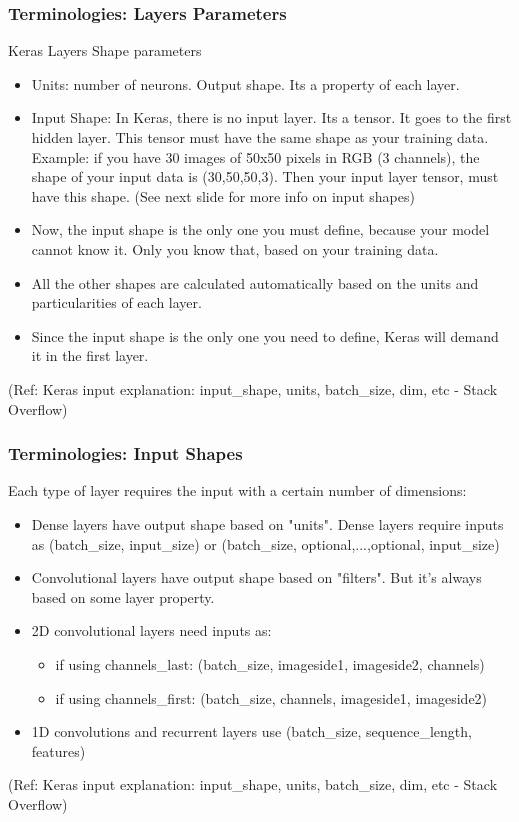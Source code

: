\begin{frame}[fragile] \frametitle{Terminologies: Layers Parameters}

Keras Layers Shape parameters

\begin{itemize}
\item Units: number of neurons. Output shape. Its a property of each layer.
\item Input Shape: In Keras, there is no input layer. Its a tensor. It goes to the first hidden layer. This tensor must have the same shape as your training data. Example: if you have 30 images of 50x50 pixels in RGB (3 channels), the shape of your input data is (30,50,50,3). Then your input layer tensor, must have this shape. (See next slide for more info on input shapes)
\item Now, the input shape is the only one you must define, because your model cannot know it. Only you know that, based on your training data.

\item All the other shapes are calculated automatically based on the units and particularities of each layer.
\item Since the input shape is the only one you need to define, Keras will demand it in the first layer.
\end{itemize}

\tiny{(Ref: Keras input explanation: input\_shape, units, batch\_size, dim, etc - Stack Overflow)}
\end{frame}

\begin{frame}[fragile] \frametitle{Terminologies: Input Shapes}

Each type of layer requires the input with a certain number of dimensions:

\begin{itemize}
\item Dense layers have output shape based on "units". Dense layers require inputs as (batch\_size, input\_size) or (batch\_size, optional,...,optional, input\_size)
\item Convolutional layers have output shape based on "filters". But it's always based on some layer property. 
\item 2D convolutional layers need inputs as:
\begin{itemize}
\item if using channels\_last: (batch\_size, imageside1, imageside2, channels)
\item if using channels\_first: (batch\_size, channels, imageside1, imageside2)
\end{itemize}
\item 1D convolutions and recurrent layers use (batch\_size, sequence\_length, features)
\end{itemize}

\tiny{(Ref: Keras input explanation: input\_shape, units, batch\_size, dim, etc - Stack Overflow)}
\end{frame}

